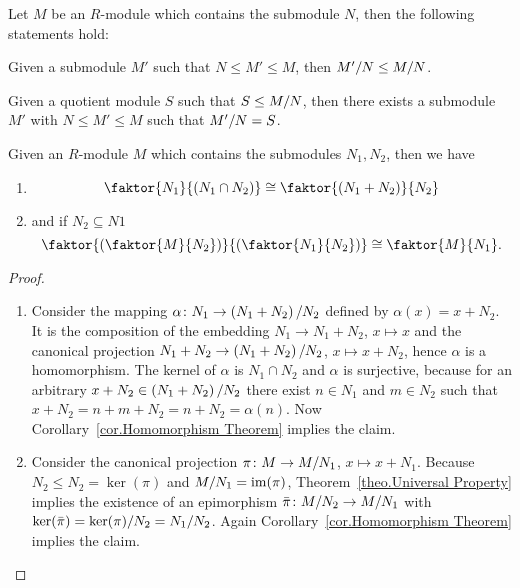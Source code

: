 \begin{cor}
Let $M$ be an $R$-module which contains the submodule $N$, then the following statements hold:
\begin{exlist}
\item Given a submodule $M'$ such that $N\leq M'\leq M$, then $\nicefrac{M'}{N}\leq\MtN$.
\item Given a quotient module $S$ such that $S\leq\MtN$, then there exists a submodule $M'$ with $N\leq M'\leq M$ such that $\nicefrac{M'}{N}=S$.
\end{exlist}
\end{cor}

\begin{cor}
Given an $R$-module $M$ which contains the submodules $N_1,N_2$, then we have
\begin{enumerate}
\item $$\faktor{N_1}{\left(N_1\cap N_2\right)}\cong\faktor{\left(N_1+N_2\right)}{N_2}$$
\item and if $N_2\subseteq N1$ $$\faktor{\left(\faktor{M}{N_2}\right)}{\left(\faktor{N_1}{N_2}\right)}\cong\faktor{M}{N_1}.$$
\end{enumerate}
\end{cor}
\begin{proof}
\begin{enumerate}
\item Consider the mapping $\alpha\colon N_1\to \nicefrac{\left(N_1+N_2\right)}{N_2}$ defined by $\alpha(x)=x+N_2$. It is the composition of the embedding $N_1\to N_1+N_2$, $x\mapsto x$ and the canonical projection $N_1+N_2\to\nicefrac{\left(N_1+N_2\right)}{N_2}$, $x\mapsto x+N_2$, hence $\alpha$ is a homomorphism. The kernel of $\alpha$ is $N_1\cap N_2$ and $\alpha$ is surjective, because for an arbitrary $x+N_2\in\nicefrac{\left(N_1+N_2\right)}{N_2}$ there exist $n\in N_1$ and $m\in N_2$ such that $x+N_2=n+m+N_2=n+N_2=\alpha(n)$. Now Corollary~\ref{cor.Homomorphism Theorem} implies the claim. 
\item Consider the canonical projection $\pi\colon M\to \nicefrac{M}{N_1}$, $x\mapsto x+N_1$. Because $N_2\leq N_2=\ker(\pi)$ and $\nicefrac{M}{N_1}=\im(\pi)$, Theorem~\ref{theo.Universal Property} implies the existence of an epimorphism $\bar{\pi}\colon \nicefrac{M}{N_2}\to\nicefrac{M}{N_1}$ with $\ker(\bar{\pi})=\nicefrac{\ker(\pi)}{N_2}=\nicefrac{N_1}{N_2}$. Again Corollary~\ref{cor.Homomorphism Theorem} implies the claim.
\end{enumerate}
\end{proof}